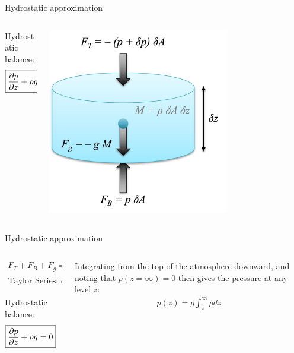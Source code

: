 \documentclass[aspectratio=169,xcolor=dvipsnames]{beamer}
\begin{document}
{\begin{frame}{Hydrostatic approximation}
\begin{columns}
\begin{column}{0.5\textwidth}
   Hydrostatic balance:
   \begin{align*}
       \Aboxed{\frac{\partial p}{\partial z} + \rho g = 0}
   \end{align*}
    
\end{column}
\begin{column}{0.5\textwidth}
    \begin{center}
     \includegraphics[width=0.7\textwidth]{figs/Fig-Pressure-on-cylinder-ajr.png}
     \end{center}
\end{column}
\end{columns}

\end{frame}

\begin{frame}{Hydrostatic approximation}

\begin{columns}
\begin{column}{0.5\textwidth}
   \begin{align*}
       F_T + F_B + F_g = \delta p + \rho g\delta z = 0
   \end{align*}
   \begin{align*}
       \text{Taylor Series: }\delta p \approx \frac{\partial p}{\partial z}\delta z
   \end{align*}

   Hydrostatic balance:
   \begin{align*}
       \Aboxed{\frac{\partial p}{\partial z} + \rho g = 0}
   \end{align*}
    
\end{column}
\begin{column}{0.5\textwidth}
    Integrating from the top of the atmosphere downward, and noting that $p(z=\infty)=0$ then gives the pressure at any level $z$:
    \begin{align*}
        p(z) = g \int_z^\infty \rho dz
    \end{align*}
\end{column}
\end{columns}

\end{frame}

} %
\end{document}
